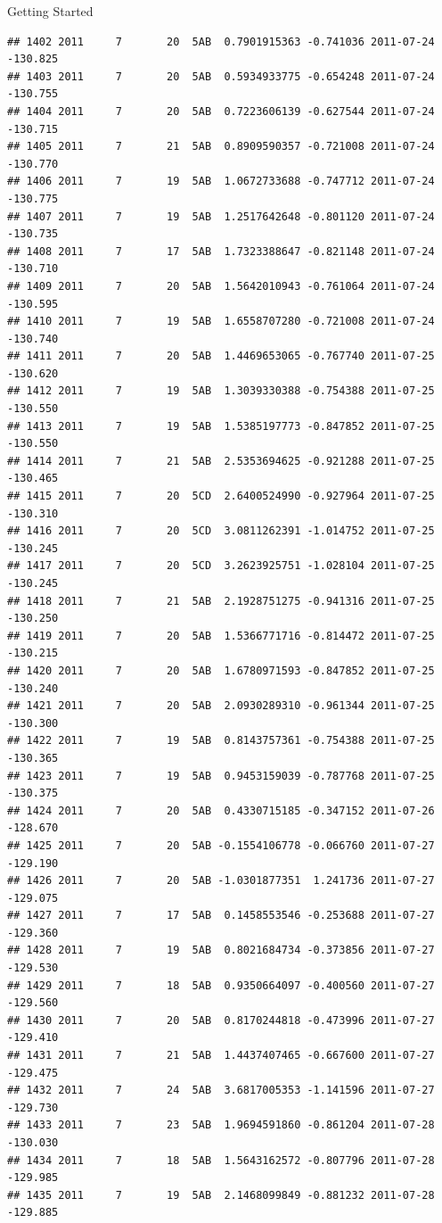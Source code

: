\documentclass[
  ignorenonframetext,
]{beamer}
\begin{document}
\begin{frame}[fragile]{Getting Started}
\begin{verbatim}
## 1402 2011     7       20  5AB  0.7901915363 -0.741036 2011-07-24 -130.825
## 1403 2011     7       20  5AB  0.5934933775 -0.654248 2011-07-24 -130.755
## 1404 2011     7       20  5AB  0.7223606139 -0.627544 2011-07-24 -130.715
## 1405 2011     7       21  5AB  0.8909590357 -0.721008 2011-07-24 -130.770
## 1406 2011     7       19  5AB  1.0672733688 -0.747712 2011-07-24 -130.775
## 1407 2011     7       19  5AB  1.2517642648 -0.801120 2011-07-24 -130.735
## 1408 2011     7       17  5AB  1.7323388647 -0.821148 2011-07-24 -130.710
## 1409 2011     7       20  5AB  1.5642010943 -0.761064 2011-07-24 -130.595
## 1410 2011     7       19  5AB  1.6558707280 -0.721008 2011-07-24 -130.740
## 1411 2011     7       20  5AB  1.4469653065 -0.767740 2011-07-25 -130.620
## 1412 2011     7       19  5AB  1.3039330388 -0.754388 2011-07-25 -130.550
## 1413 2011     7       19  5AB  1.5385197773 -0.847852 2011-07-25 -130.550
## 1414 2011     7       21  5AB  2.5353694625 -0.921288 2011-07-25 -130.465
## 1415 2011     7       20  5CD  2.6400524990 -0.927964 2011-07-25 -130.310
## 1416 2011     7       20  5CD  3.0811262391 -1.014752 2011-07-25 -130.245
## 1417 2011     7       20  5CD  3.2623925751 -1.028104 2011-07-25 -130.245
## 1418 2011     7       21  5AB  2.1928751275 -0.941316 2011-07-25 -130.250
## 1419 2011     7       20  5AB  1.5366771716 -0.814472 2011-07-25 -130.215
## 1420 2011     7       20  5AB  1.6780971593 -0.847852 2011-07-25 -130.240
## 1421 2011     7       20  5AB  2.0930289310 -0.961344 2011-07-25 -130.300
## 1422 2011     7       19  5AB  0.8143757361 -0.754388 2011-07-25 -130.365
## 1423 2011     7       19  5AB  0.9453159039 -0.787768 2011-07-25 -130.375
## 1424 2011     7       20  5AB  0.4330715185 -0.347152 2011-07-26 -128.670
## 1425 2011     7       20  5AB -0.1554106778 -0.066760 2011-07-27 -129.190
## 1426 2011     7       20  5AB -1.0301877351  1.241736 2011-07-27 -129.075
## 1427 2011     7       17  5AB  0.1458553546 -0.253688 2011-07-27 -129.360
## 1428 2011     7       19  5AB  0.8021684734 -0.373856 2011-07-27 -129.530
## 1429 2011     7       18  5AB  0.9350664097 -0.400560 2011-07-27 -129.560
## 1430 2011     7       20  5AB  0.8170244818 -0.473996 2011-07-27 -129.410
## 1431 2011     7       21  5AB  1.4437407465 -0.667600 2011-07-27 -129.475
## 1432 2011     7       24  5AB  3.6817005353 -1.141596 2011-07-27 -129.730
## 1433 2011     7       23  5AB  1.9694591860 -0.861204 2011-07-28 -130.030
## 1434 2011     7       18  5AB  1.5643162572 -0.807796 2011-07-28 -129.985
## 1435 2011     7       19  5AB  2.1468099849 -0.881232 2011-07-28 -129.885

\end{verbatim}
\end{frame}
\end{document}

